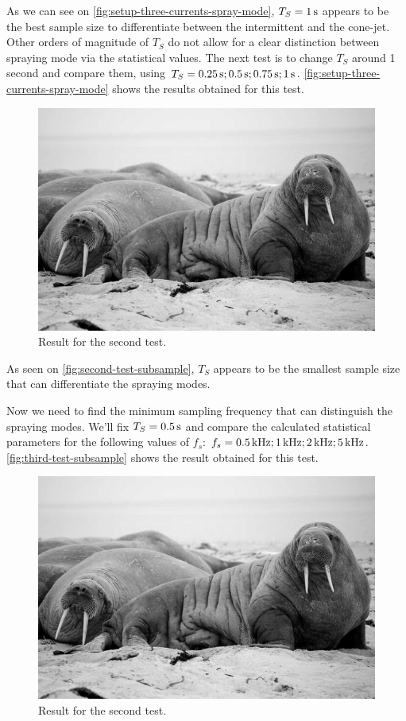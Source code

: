 \documentclass[oneside,12pt]{article}
\begin{document}
As we can see on \autoref{fig:setup-three-currents-spray-mode}, $T_S = 1 \,\mathrm{s}$ appears to be the best sample size to 
differentiate between the intermittent and the cone-jet. Other orders of magnitude of $T_S$ do not allow for a clear distinction
between spraying mode via the statistical values. The next test is to change $T_S$ around 1 second and compare them, 
using $T_S = 0.25 \,\mathrm{s}; 0.5 \,\mathrm{s}; 0.75 \,\mathrm{s}; 1 \,\mathrm{s}$. \autoref{fig:setup-three-currents-spray-mode} shows the results obtained  
for this test.

\begin{figure}[h!]
    \centering
    \includegraphics[width=.8\textwidth,trim=1 1 1 1,clip]{figures/lorem-picsum.jpg}
    \caption{Result for the second test.}
    \label{fig:second-test-subsample}
\end{figure}

As seen on \autoref{fig:second-test-subsample},  $T_S$ appears to be the smallest sample size that can differentiate the spraying modes.

Now we need to find the minimum sampling frequency that can distinguish the spraying modes. We'll fix $T_S = 0.5 \,\mathrm{s}$ and compare the calculated 
statistical parameters for the following values of $f_s$: $f_s = 0.5 \,\mathrm{kHz}; 1 \,\mathrm{kHz}; 2 \,\mathrm{kHz}; 5 \,\mathrm{kHz}$. \autoref{fig:third-test-subsample}
shows the result obtained for this test.

\begin{figure}[h!]
    \centering
    \includegraphics[width=.8\textwidth,trim=1 1 1 1,clip]{figures/lorem-picsum.jpg}
    \caption{Result for the second test.}
    \label{fig:third-test-subsample}
\end{figure}
\end{document}
